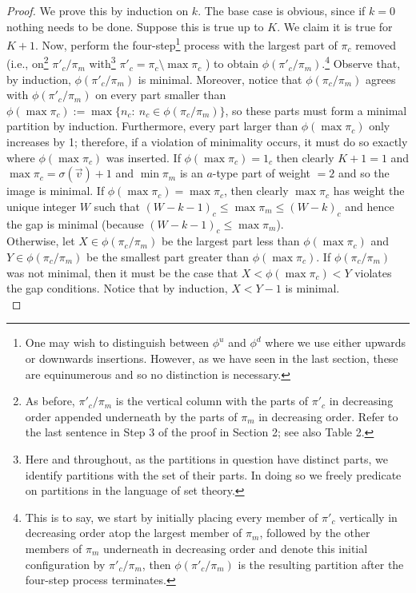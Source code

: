 \documentclass[12pt,a4paper]{amsart}
\theoremstyle{definition}
\theoremstyle{notation}
\theoremstyle{corollary}
\begin{document}
\begin{proof}
We prove this by induction on $k$. The base case is obvious, since if $k=0$ nothing needs to be done. Suppose this is true up to $K$. We claim it is true for $K+1$. Now, perform the four-step\footnote{One may wish to distinguish between $\phi^u$ and $\phi^d$ where we use either upwards or downwards insertions. However, as we have seen in the last section, these are equinumerous and so no distinction is necessary.} process with the largest part of $\pi_c$ removed (i.e., on\footnote{As before, $\pi'_c/\pi_m$ is the vertical column with the parts of $\pi'_c$ in decreasing order appended underneath by the parts of $\pi_m$ in decreasing order. Refer to the last sentence in Step 3 of the proof in Section 2; see also Table 2.} $\pi'_c/\pi_m$ with\footnote{Here and throughout, as the partitions in question have distinct parts, we identify partitions with the set of their parts. In doing so we freely predicate on partitions in the language of set theory.} $\pi'_c=\pi_c\setminus\max{\pi_c}$ ) to obtain $\phi(\pi'_c/\pi_m)$.\footnote{This is to say, we start by initially placing every member of $\pi'_c$ vertically in decreasing order atop the largest member of $\pi_m$, followed by the other members of $\pi_m$ underneath in decreasing order and denote this initial configuration by $\pi'_c/\pi_m$, then $\phi(\pi'_c/\pi_m)$ is the resulting partition after the four-step process terminates.}
Observe that, by induction, $\phi(\pi'_c/\pi_m)$ is minimal. Moreover, notice that $\phi(\pi_c/\pi_m)$ agrees with $\phi(\pi'_c/\pi_m)$ on every part smaller than $\phi(\max{\pi_c}):=\max\{n_c:\ n_c\in\phi(\pi_c/\pi_m)\}$, so these parts must form a minimal partition by induction. Furthermore, every part larger than $\phi(\max{\pi_c})$ only increases by 1; therefore, if a violation of minimality occurs, it must do so exactly where $\phi(\max{\pi_c})$ was inserted. If $\phi(\max{\pi_c})=1_c$ then clearly $K+1=1$ and $\max{\pi_c}=\sigma(\vec{v})+1$ and $\min{\pi_m}$ is an $a$-type part of weight $=2$ and so the image is minimal. If $\phi(\max{\pi_c})=\max{\pi_c}$, then clearly $\max{\pi_c}$ has weight the unique integer $W$ such that $(W-k-1)_c\leq \max{\pi_m}\leq(W-k)_c$ and hence the gap is minimal (because $(W-k-1)_c\leq \max{\pi_m}$).\\

Otherwise, let $X\in\phi(\pi_c/\pi_m)$ be the largest part less than $\phi(\max{\pi_c})$ and $Y\in\phi(\pi_c/\pi_m)$ be the smallest part greater than $\phi(\max{\pi_c})$. If $\phi(\pi_c/\pi_m)$ was not minimal, then it must be the case that $X<\phi(\max{\pi_c})<Y$ violates the gap conditions. Notice that by induction, $X<Y-1$ is minimal.\\


\end{proof}
\end{document}
